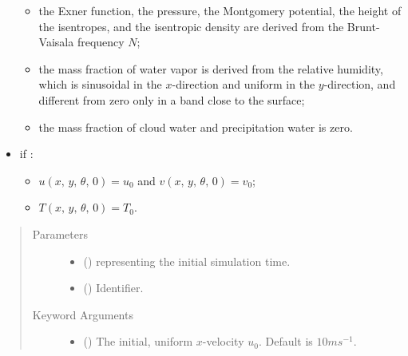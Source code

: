 \documentclass[letterpaper,10pt,english]{sphinxmanual}
\begin{document}
\begin{fulllineitems}
\begin{fulllineitems}
\begin{itemize}
\begin{itemize}
\item {} 
the Exner function, the pressure, the Montgomery potential, the height of the isentropes,                             and the isentropic density are derived from the Brunt-Vaisala frequency \(N\);

\item {} 
the mass fraction of water vapor is derived from the relative humidity, which is sinusoidal in the                            \(x\)-direction and uniform in the \(y\)-direction, and different from zero only in a band                              close to the surface;

\item {} 
the mass fraction of cloud water and precipitation water is zero.

\end{itemize}

\item {} 
if :
\begin{itemize}
\item {} 
\(u(x, \, y, \, \theta, \, 0) = u_0\) and \(v(x, \, y, \, \theta, \, 0) = v_0\);

\item {} 
\(T(x, \, y, \, \theta, \, 0) = T_0\).

\end{itemize}

\end{itemize}
\begin{quote}\begin{description}
\item[{Parameters}] \leavevmode\begin{itemize}
\item {} 
 () \textendash{}  representing the initial simulation time.

\item {} 
 () \textendash{} Identifier.

\end{itemize}

\item[{Keyword Arguments}] \leavevmode\begin{itemize}
\item {} 
 () \textendash{} The initial, uniform \(x\)-velocity \(u_0\). Default is \(10 m s^{-1}\).


\end{itemize}
\end{description}
\end{quote}
\end{fulllineitems}
\end{fulllineitems}
\end{document}
